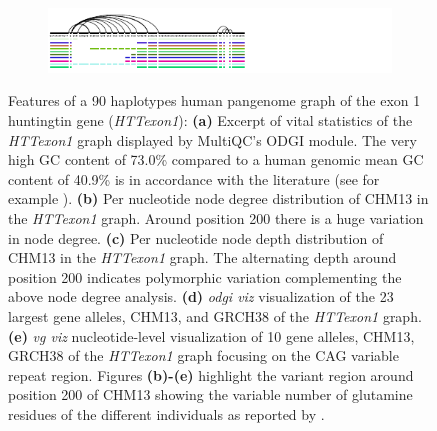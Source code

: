 \begin{figure}[ht!]
\begin{subfigure}{\linewidth}
	\includegraphics[width=1.0\linewidth, trim=-0.4cm 0.1cm 3.15cm 0cm, clip]{fig/metrics/chr4_pan_HTTex1_STR_xg_svg.pdf}
	\label{fig:metrics-str}
\end{subfigure}
	\caption{Features of a 90 haplotypes human pangenome graph of the exon 1 huntingtin gene (\textit{HTTexon1}): \textbf{(a)} Excerpt of vital statistics of the \textit{HTTexon1} graph displayed by MultiQC's ODGI module. The very high GC content of 73.0\% compared to a human genomic mean GC content of 40.9\% \cite{Piovesan2019} is in accordance with the literature (see for example \cite{Sathasivam2013, Neueder2017}). \textbf{(b)} Per nucleotide node degree distribution of CHM13 in the \textit{HTTexon1} graph. Around position 200 there is a huge variation in node degree. \textbf{(c)} Per nucleotide node depth distribution of CHM13 in the \textit{HTTexon1} graph. The alternating depth around position 200 indicates polymorphic variation complementing the above node degree analysis. \textbf{(d)} \textit{odgi viz} visualization of the 23 largest gene alleles, CHM13, and GRCH38 of the \textit{HTTexon1} graph. \textbf{(e)} \textit{vg viz} nucleotide-level visualization of 10 gene alleles, CHM13, GRCH38 of the \textit{HTTexon1} graph focusing on the CAG variable repeat region. Figures \textbf{(b)-(e)} highlight the variant region around position 200 of CHM13 showing the variable number of glutamine residues of the different individuals as reported by \cite{Nance1999}.}
	\label{fig:metrics}
\end{figure}
